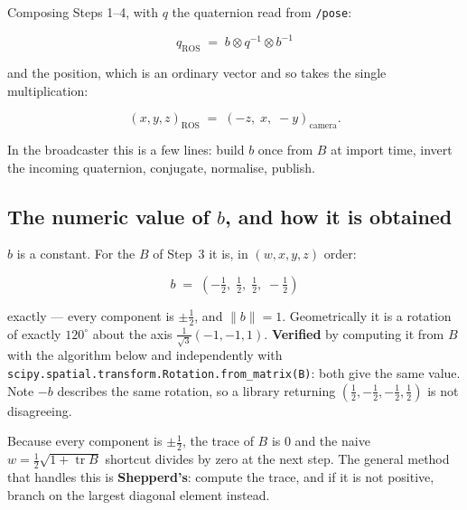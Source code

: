 \documentclass[11pt]{report}
\begin{document}
Composing Steps 1--4, with $q$ the quaternion read from \texttt{/pose}:

\[
\boxed{\;q_{\text{ROS}} \;=\; b \otimes q^{-1} \otimes b^{-1}\;}
\]

and the position, which is an ordinary vector and so takes the single
multiplication:

\[
(x,y,z)_{\text{ROS}} \;=\; (-z,\; x,\; -y)_{\text{camera}} .
\]

In the broadcaster this is a few lines: build $b$ once from $B$ at import
time, invert the incoming quaternion, conjugate, normalise, publish.

\subsection{The numeric value of $b$, and how it is obtained}
\label{sec:b-value}

$b$ is a constant. For the $B$ of Step~3 it is, in $(w,x,y,z)$ order:

\[
b \;=\; \left(-\tfrac{1}{2},\; \tfrac{1}{2},\; \tfrac{1}{2},\; -\tfrac{1}{2}\right)
\]

exactly --- every component is $\pm\tfrac{1}{2}$, and $\lVert b\rVert = 1$.
Geometrically it is a rotation of exactly $120^\circ$ about the axis
$\tfrac{1}{\sqrt{3}}(-1,-1,1)$. \textbf{Verified} by computing it from $B$
with the algorithm below and independently with
\texttt{scipy.spatial.transform.Rotation.from\_matrix(B)}: both give the same
value. Note $-b$ describes the same rotation, so a library returning
$(\tfrac{1}{2}, -\tfrac{1}{2}, -\tfrac{1}{2}, \tfrac{1}{2})$ is not
disagreeing.

Because every component is $\pm\tfrac12$, the trace of $B$ is $0$ and the
naive $w = \tfrac12\sqrt{1+\operatorname{tr}B}$ shortcut divides by zero at
the next step. The general method that handles this is \textbf{Shepperd's}:
compute the trace, and if it is not positive, branch on the largest diagonal
element instead.
\end{document}
